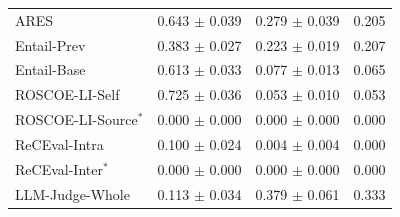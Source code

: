\begin{table}[t]
{\begin{tabular}{lccc}
ARES
    & 0.643 $\pm$ 0.039 & 0.279 $\pm$ 0.039 & 0.205 \\
Entail-Prev
    & 0.383 $\pm$ 0.027 & 0.223 $\pm$ 0.019 & 0.207 \\
Entail-Base
    & 0.613 $\pm$ 0.033 & 0.077 $\pm$ 0.013 & 0.065 \\
ROSCOE-LI-Self
    & 0.725 $\pm$ 0.036 & 0.053 $\pm$ 0.010 & 0.053 \\
ROSCOE-LI-Source$^\ast$
    & 0.000 $\pm$ 0.000 & 0.000 $\pm$ 0.000 & 0.000 \\
ReCEval-Intra
    & 0.100 $\pm$ 0.024 & 0.004 $\pm$ 0.004 & 0.000 \\
ReCEval-Inter$^\ast$
    & 0.000 $\pm$ 0.000 & 0.000 $\pm$ 0.000 & 0.000 \\
LLM-Judge-Whole
    & 0.113 $\pm$ 0.034 & 0.379 $\pm$ 0.061 & 0.333 \\

\bottomrule
\end{tabular}
}
\end{table}

